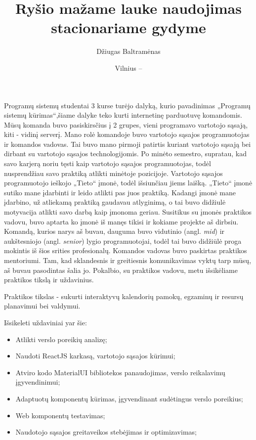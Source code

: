 \documentclass{VUMIFPSbakalaurinis}
\title{Ryšio mažame lauke naudojimas stacionariame gydyme}
\author{Džiugas Baltramėnas}
\date{Vilnius – \the\year}
\begin{document}
\maketitle

\tableofcontents

Programų sistemų studentai 3 kurse turėjo dalyką, kurio pavadinimas „Programų sistemų kūrimas“,šiame dalyke teko kurti internetinę parduotuvę komandomis. Mūsų komanda buvo pasiskirsčius į 2 grupes, vieni programavo vartotojo sąsają, kiti - vidinį serverį. Mano rolė komandoje buvo vartotojo sąsajos programuotojas ir komandos vadovas. Tai buvo mano pirmoji patirtis kuriant vartotojo sąsają bei dirbant su vartotojo sąsajos technologijomis. Po minėto semestro, supratau, kad savo karjerą noriu tęsti kaip vartotojo sąsajos programuotojas, todėl nusprendžiau savo praktiką atlikti minėtoje pozicijoje. Vartotojo sąsajos programuotojo ieškojo „Tieto“ įmonė, todėl išsiunčiau jiems laišką. „Tieto“ įmonė sutiko mane įdarbinti ir leido atlikti pas juos praktiką. Kadangi įmonė mane įdarbino, už atliekamą praktiką gaudavau atlyginimą, o tai buvo didžiulė motyvacija atlikti savo darbą kaip įmonoma geriau. Susitikus su įmonės praktikos vadovu, buvo aptarta ko įmonė iš manęs tikisi ir kokiame projekte aš dirbsiu. Komandą, kurios narys aš buvau, dauguma buvo vidutinio (angl. \textit{mid}) ir aukštesniojo (angl. \textit{senior}) lygio programuotojai, todėl tai buvo didžiūlė proga mokintis iš šios srities profesionalų. Komandos vadovas buvo paskirtas praktikos mentoriumi. Tam, kad sklandesnis ir greitiesnis komunikavimas vyktų tarp mūsų, aš buvau pasodintas šalia jo. Pokalbio, su praktikos vadovu, metu išsikėliame praktikos tikslą ir uždavinius.

Praktikos tikslas - sukurti interaktyvų kalendorių pamokų, egzaminų ir resursų planavimui bei valdymui.

Išsikeleti uždaviniai yar šie:
\begin{itemize}
    \item Atlikti verslo poreikių analizę;
    \item Naudoti ReactJS karkasą, vartotojo sąsajos kūrimui;
    \item Atviro kodo MaterialUI bibliotekos panaudojimas, verslo reikalavimų įgyvendinimui;
    \item Adaptuotų komponentų kūrimas, įgyvendinant sudėtingus verslo poreikius;
    \item Web komponentų testavimas;
    \item Naudotojo sąsajos greitaveikos stebėjimas ir optimizavimas;
\end{itemize}
\end{document}
